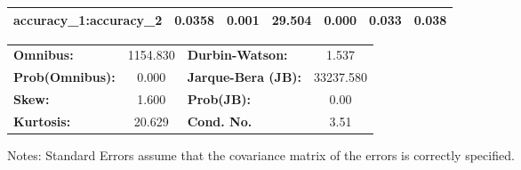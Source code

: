 \begin{center}
\begin{tabular}{lcccccc}
\textbf{accuracy\_1:accuracy\_2} &       0.0358  &        0.001     &    29.504  &         0.000        &        0.033    &        0.038     \\
\bottomrule
\end{tabular}
\begin{tabular}{lclc}
\textbf{Omnibus:}       & 1154.830 & \textbf{  Durbin-Watson:     } &     1.537  \\
\textbf{Prob(Omnibus):} &   0.000  & \textbf{  Jarque-Bera (JB):  } & 33237.580  \\
\textbf{Skew:}          &   1.600  & \textbf{  Prob(JB):          } &      0.00  \\
\textbf{Kurtosis:}      &  20.629  & \textbf{  Cond. No.          } &      3.51  \\
\bottomrule
\end{tabular}
\end{center}

Notes: \newline
 [1] Standard Errors assume that the covariance matrix of the errors is correctly specified.